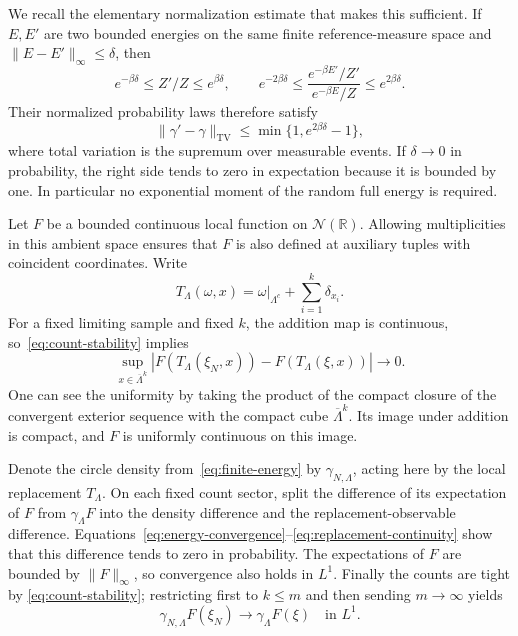 \documentclass[11pt]{article}
\theoremstyle{remark}\newtheorem{remark}[theorem]{Remark}
\newcommand{\R}{\mathbb R}
\newcommand{\Conf}{\mathcal N}
\newcommand{\TV}{\operatorname{TV}}
\begin{document}
We recall the elementary normalization estimate that makes this
sufficient. If $E,E'$ are two bounded energies on the same finite
reference-measure space and $\|E-E'\|_\infty\le\delta$, then
\[
 e^{-\beta\delta}\le Z'/Z\le e^{\beta\delta},\qquad
 e^{-2\beta\delta}
  \le\frac{e^{-\beta E'}/Z'}{e^{-\beta E}/Z}
  \le e^{2\beta\delta}.
\]
Their normalized probability laws therefore satisfy
\begin{equation}\label{eq:TV}
 \|\gamma'-\gamma\|_{\TV}
   \le\min\{1,e^{2\beta\delta}-1\},
\end{equation}
where total variation is the supremum over measurable events.
If $\delta\to0$ in probability, the right side tends to zero in
expectation because it is bounded by one. In particular no
exponential moment of the random full energy is required.

Let $F$ be a bounded continuous local function on $\Conf(\R)$.
Allowing multiplicities in this ambient space ensures that $F$
is also defined at auxiliary tuples with coincident coordinates.
Write
\[
 T_\Lambda(\omega,x)
       =\omega|_{\Lambda^c}+\sum_{i=1}^k\delta_{x_i}.
\]
For a fixed limiting sample and fixed $k$, the addition map is
continuous, so~\eqref{eq:count-stability} implies
\begin{equation}\label{eq:replacement-continuity}
 \sup_{x\in\overline\Lambda^k}
 |F(T_\Lambda(\xi_N,x))-F(T_\Lambda(\xi,x))|
                         \longrightarrow0.
\end{equation}
One can see the uniformity by taking the product of the compact
closure of the convergent exterior sequence with the compact cube
$\overline\Lambda^k$. Its image under addition is compact, and
$F$ is uniformly continuous on this image.

Denote the circle density from~\eqref{eq:finite-energy} by
$\gamma_{N,\Lambda}$, acting here by the local replacement
$T_\Lambda$. On each fixed count sector, split the difference
of its expectation of $F$ from $\gamma_\Lambda F$ into the
density difference and the replacement-observable difference.
Equations~\eqref{eq:energy-convergence}--\eqref{eq:replacement-continuity}
show that this difference tends to zero in probability. The
expectations of $F$ are bounded by $\|F\|_\infty$, so convergence
also holds in $L^1$. Finally the counts are tight by
\eqref{eq:count-stability}; restricting first to $k\le m$ and
then sending $m\to\infty$ yields
\begin{equation}\label{eq:operator-convergence}
 \gamma_{N,\Lambda}F(\xi_N)
        \longrightarrow\gamma_\Lambda F(\xi)
        \quad\text{in }L^1.
\end{equation}
\end{document}
